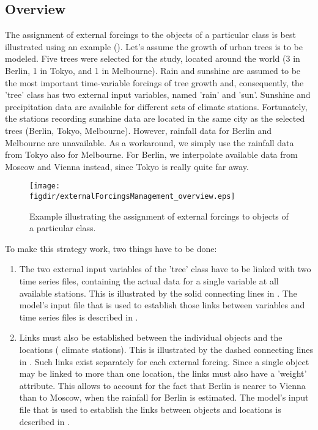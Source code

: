\subsection{Overview} \label{sec:input-external-overview}

The assignment of external forcings to the objects of a particular class is best illustrated using an example (). Let's assume the growth of urban trees is to be modeled. Five trees were selected for the study, located around the world (3 in Berlin, 1 in Tokyo, and 1 in Melbourne). Rain and sunshine are assumed to be the most important time-variable forcings of tree growth and, consequently, the 'tree' class has two external input variables, named 'rain' and 'sun'. Sunshine and precipitation data are available for different sets of climate stations. Fortunately, the stations recording sunshine data are located in the same city as the selected trees (Berlin, Tokyo, Melbourne). However, rainfall data for Berlin and Melbourne are unavailable. As a workaround, we simply use the rainfall data from Tokyo also for Melbourne. For Berlin, we interpolate available data from Moscow and Vienna instead, since Tokyo is really quite far away.

\begin{figure}[htbp]
  \centering
  \texttt{[image: \\figdir/externalForcingsManagement\_overview.eps]}
  \caption{Example illustrating the assignment of external forcings to objects of a particular class. \label{fig:input-external-overview}}
\end{figure}

To make this strategy work, two things have to be done:
\begin{enumerate}
  \item The two external input variables of the 'tree' class have to be linked with two time series files, containing the actual data for a single variable at all available stations. This is illustrated by the solid connecting lines in . The model's input file that is used to establish those links between variables and time series files is described in .
  \item Links must also be established between the individual objects and the locations (\ie{} climate stations). This is illustrated by the dashed connecting lines in . Such links exist separately for each external forcing. Since a single object may be linked to more than one location, the links must also have a 'weight' attribute. This allows to account for the fact that Berlin is nearer to Vienna than to Moscow, when the rainfall for Berlin is estimated. The model's input file that is used to establish the links between objects and locations is described in .
\end{enumerate}

